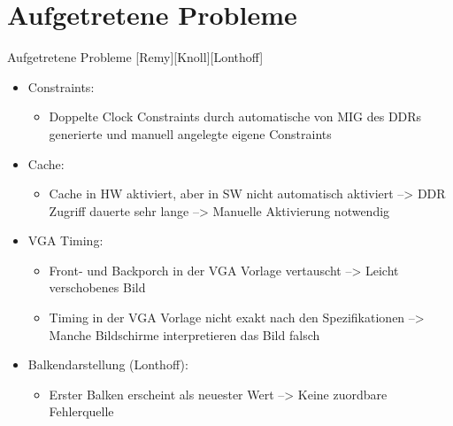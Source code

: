 \section{Aufgetretene Probleme}
\begin{frame}{Aufgetretene Probleme [Remy][Knoll][Lonthoff]}
    \begin{itemize}
        \item Constraints:
        \begin{itemize}
            \item Doppelte Clock Constraints durch automatische von MIG des DDRs generierte und manuell angelegte eigene Constraints
        \end{itemize}
        \item Cache:
        \begin{itemize}
            \item Cache in HW aktiviert, aber in SW nicht automatisch aktiviert
            \newline
            --> DDR Zugriff dauerte sehr lange
            \newline
            --> Manuelle Aktivierung notwendig
        \end{itemize}
        \item VGA Timing:
        \begin{itemize}
            \item Front- und Backporch in der VGA Vorlage vertauscht
            \newline
            --> Leicht verschobenes Bild
            \item Timing in der VGA Vorlage nicht exakt nach den Spezifikationen
            \newline
            --> Manche Bildschirme interpretieren das Bild falsch
        \end{itemize}
        \item Balkendarstellung (Lonthoff):
        \begin{itemize}
            \item Erster Balken erscheint als neuester Wert
            \newline
            --> Keine zuordbare Fehlerquelle
        \end{itemize}
    \end{itemize}
\end{frame}